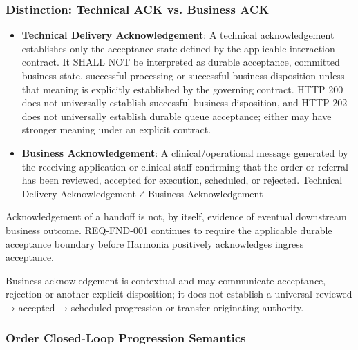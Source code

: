 \subsubsection*{Distinction: Technical ACK vs. Business ACK}
\label{rad:enabling:263}

\begin{itemize}

\item 
\textbf{Technical Delivery Acknowledgement}: A technical acknowledgement establishes only the acceptance state defined by the applicable interaction contract. It SHALL NOT be interpreted as durable acceptance, committed business state, successful processing or successful business disposition unless that meaning is explicitly established by the governing contract. HTTP 200 does not universally establish successful business disposition, and HTTP 202 does not universally establish durable queue acceptance; either may have stronger meaning under an explicit contract.



\item 
\textbf{Business Acknowledgement}: A clinical/\allowbreak{}operational message generated by the receiving application or clinical staff confirming that the order or referral has been reviewed, accepted for execution, scheduled, or rejected.  Technical Delivery Acknowledgement ≠  Business Acknowledgement



\end{itemize}
\label{rad:enabling:267}

Acknowledgement of a handoff is not, by itself, evidence of eventual downstream business outcome. \href{https://github.com/fhirfactory/harmonia/blob/98410db60155198a75f74c79d98060070209faa1/docs/markdown/01-motivation/requirements-constraints/foundational-requirements.md\#req-fnd-001-durable-ingress-acceptance-boundary}{REQ-FND-001} continues to require the applicable durable acceptance boundary before Harmonia positively acknowledges ingress acceptance.

\label{rad:enabling:269}

Business acknowledgement is contextual and may communicate acceptance, rejection or another explicit disposition; it does not establish a universal reviewed → accepted → scheduled progression or transfer originating authority.

\label{rad:enabling:271}
\subsubsection*{Order Closed-Loop Progression Semantics}
\label{rad:enabling:272}

